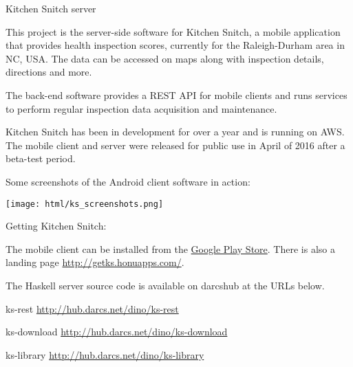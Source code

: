 \begin{hcarentry}[new]{Kitchen Snitch server}
\makeheader

This project is the server-side software for Kitchen Snitch, a mobile
application that provides health inspection scores, currently for the
Raleigh-Durham area in NC, USA. The data can be accessed on maps along with
inspection details, directions and more.

\vspace{5mm}

The back-end software provides a REST API for mobile clients and runs services
to perform regular inspection data acquisition and maintenance.

\vspace{5mm}

Kitchen Snitch has been in development for over a year and is running on AWS.
The mobile client and server were released for public use in April of 2016
after a beta-test period.

\vspace{5mm}

Some screenshots of the Android client software in action:

\begin{center}
\texttt{[image: html/ks\_screenshots.png]}
\end{center}

\vspace{5mm}

Getting Kitchen Snitch:

\vspace{5mm}

The mobile client can be installed from the
\href{https://play.google.com/store/apps/details?id=com.honu.ksnitch}{Google
Play Store}. There is also a landing page
\mbox{\url{http://getks.honuapps.com/}}.

\vspace{5mm}

The Haskell server source code is available on darcshub at the URLs below.

\FurtherReading
\begin{compactitem}
 \item ks-rest \url{http://hub.darcs.net/dino/ks-rest}
 \item ks-download \url{http://hub.darcs.net/dino/ks-download}
 \item ks-library \url{http://hub.darcs.net/dino/ks-library}
\end{compactitem}

\end{hcarentry}
